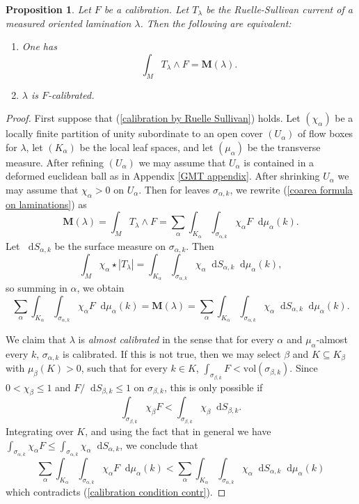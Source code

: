\documentclass[reqno,11pt]{amsart}
\newcommand*\dif{\mathop{}\!\mathrm{d}}
\newcommand{\vol}{\mathrm{vol}}
\newcommand{\Mass}{\mathbf M}
\newcommand{\dfn}[1]{\emph{#1}\index{#1}}
\newtheorem{proposition}[theorem]{Proposition}
\theoremstyle{definition}
\numberwithin{equation}{section}
\begin{document}
\begin{proposition}\label{calibration condition}
Let $F$ be a calibration.
Let $T_\lambda$ be the Ruelle-Sullivan current of a measured oriented lamination $\lambda$.
Then the following are equivalent:
\begin{enumerate}
\item One has \begin{equation}\label{calibration by Ruelle Sullivan}
\int_M T_\lambda \wedge F = \Mass(\lambda).
\end{equation}
\item $\lambda$ is $F$-calibrated.
\end{enumerate}
\end{proposition}
\begin{proof}
First suppose that (\ref{calibration by Ruelle Sullivan}) holds.
Let $(\chi_\alpha)$ be a locally finite partition of unity subordinate to an open cover $(U_\alpha)$ of flow boxes for $\lambda$, let $(K_\alpha)$ be the local leaf spaces, and let $(\mu_\alpha)$ be the transverse measure.
After refining $(U_\alpha)$ we may assume that $U_\alpha$ is contained in a deformed euclidean ball as in Appendix \ref{GMT appendix}. After shrinking $U_\alpha$ we may assume that $\chi_\alpha > 0$ on $U_\alpha$.
Then for leaves $\sigma_{\alpha,k}$, we rewrite (\ref{coarea formula on laminations}) as 
$$\Mass(\lambda) = \int_M T_\lambda \wedge F = \sum_\alpha \int_{K_\alpha} \int_{\sigma_{\alpha,k}} \chi_\alpha F \dif \mu_\alpha(k).$$
Let $\dif S_{\alpha,k}$ be the surface measure on $\sigma_{\alpha,k}$.
Then
$$\int_M \chi_\alpha \star |T_\lambda| = \int_{K_\alpha} \int_{\sigma_{\alpha,k}} \chi_\alpha \dif S_{\alpha,k} \dif \mu_\alpha(k),$$
so summing in $\alpha$, we obtain 
\begin{equation}\label{calibration condition contr}
\sum_\alpha \int_{K_\alpha} \int_{\sigma_{\alpha,k}} \chi_\alpha F \dif \mu_\alpha(k) = \Mass(\lambda) = \sum_\alpha \int_{K_\alpha} \int_{\sigma_{\alpha,k}} \chi_\alpha \dif S_{\alpha,k} \dif \mu_\alpha(k).
\end{equation}

We claim that $\lambda$ is \dfn{almost calibrated} in the sense that for every $\alpha$ and $\mu_\alpha$-almost every $k$, $\sigma_{\alpha, k}$ is calibrated.
If this is not true, then we may select $\beta$ and $K \subseteq K_\beta$ with $\mu_\beta(K) > 0$, such that for every $k \in K$, $\int_{\sigma_{\beta, k}} F < \vol(\sigma_{\beta, k})$.
Since $0 < \chi_\beta \leq 1$ and $F/\dif S_{\beta, k} \leq 1$ on $\sigma_{\beta, k}$, this is only possible if 
$$\int_{\sigma_{\beta, k}} \chi_\beta F < \int_{\sigma_{\beta, k}} \chi_\beta \dif S_{\beta, k}.$$
Integrating over $K$, and using the fact that in general we have $\int_{\sigma_{\alpha, k}} \chi_\alpha F \leq \int_{\sigma_{\alpha, k}} \chi_\alpha \dif S_{\alpha, k}$, we conclude that 
$$\sum_\alpha \int_{K_\alpha} \int_{\sigma_{\alpha, k}} \chi_\alpha F \dif \mu_\alpha(k) < \sum_\alpha \int_{K_\alpha} \int_{\sigma_{\alpha, k}} \chi_\alpha \dif S_{\alpha, k} \dif \mu_\alpha(k)$$
which contradicts (\ref{calibration condition contr}).


\end{proof}
\end{document}
